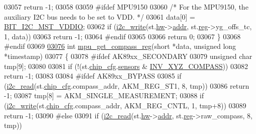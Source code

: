 \begin{DoxyCode}
{{{{{{{{{{{{{{{{{{{{{{{{{{{{{{{{{{03057         \textcolor{keywordflow}{return} -1;
03058 
03059 \textcolor{preprocessor}{#ifdef MPU9150}
03060     \textcolor{comment}{/* For the MPU9150, the auxiliary I2C bus needs to be set to VDD. */}
03061     data[0] = \hyperlink{inv__mpu_8c_ac52d7caf4efc485ef6faa1211bfe60dc}{BIT\_I2C\_MST\_VDDIO};
03062     \textcolor{keywordflow}{if} (\hyperlink{_i2_c_8c_ac0f145afe8d662af199043939f4398d6}{i2c\_write}(st.\hyperlink{structgyro__state__s_a5bac30a96752691e4cc723735060e360}{hw}->\hyperlink{structhw__s_a4c34a946600e9d68b6355d23f54d291b}{addr}, st.\hyperlink{structgyro__state__s_ae857e1285c583b7438a208edd691a38e}{reg}->yg\_offs\_tc, 1, data))
03063         \textcolor{keywordflow}{return} -1;
03064 \textcolor{preprocessor}{#endif}
03065 
03066     \textcolor{keywordflow}{return} 0;
03067 \}
03068 \textcolor{preprocessor}{#endif}
03069 
\hypertarget{inv__mpu_8c_source.tex_l03076}{}\hyperlink{group___d_r_i_v_e_r_s_ga65e6b0ce980b8c0255d7be9b55c88c08}{03076} \textcolor{keywordtype}{int} \hyperlink{group___d_r_i_v_e_r_s_ga65e6b0ce980b8c0255d7be9b55c88c08}{mpu\_get\_compass\_reg}(\textcolor{keywordtype}{short} *data, \textcolor{keywordtype}{unsigned} \textcolor{keywordtype}{long} *timestamp)
03077 \{
03078 \textcolor{preprocessor}{#ifdef AK89xx\_SECONDARY}
03079     \textcolor{keywordtype}{unsigned} \textcolor{keywordtype}{char} tmp[9];
03080 
03081     \textcolor{keywordflow}{if} (!(st.\hyperlink{structgyro__state__s_ac895217592e2084bd520b0be8e9d20ee}{chip\_cfg}.\hyperlink{structchip__cfg__s_aaa21c01566947e7007476657cb614e3f}{sensors} & \hyperlink{group___d_r_i_v_e_r_s_ga7fc9c1dbdcb2ac8cc2a4128a5799482a}{INV\_XYZ\_COMPASS}))
03082         \textcolor{keywordflow}{return} -1;
03083 
03084 \textcolor{preprocessor}{#ifdef AK89xx\_BYPASS}
03085     \textcolor{keywordflow}{if} (\hyperlink{_i2_c_8c_ac2d47e7a6c76f93f9b537c31a2986e7b}{i2c\_read}(st.\hyperlink{structgyro__state__s_ac895217592e2084bd520b0be8e9d20ee}{chip\_cfg}.compass\_addr, AKM\_REG\_ST1, 8, tmp))
03086         \textcolor{keywordflow}{return} -1;
03087     tmp[8] = AKM\_SINGLE\_MEASUREMENT;
03088     \textcolor{keywordflow}{if} (\hyperlink{_i2_c_8c_ac0f145afe8d662af199043939f4398d6}{i2c\_write}(st.\hyperlink{structgyro__state__s_ac895217592e2084bd520b0be8e9d20ee}{chip\_cfg}.compass\_addr, AKM\_REG\_CNTL, 1, tmp+8))
03089         \textcolor{keywordflow}{return} -1;
03090 \textcolor{preprocessor}{#else}
03091     \textcolor{keywordflow}{if} (\hyperlink{_i2_c_8c_ac2d47e7a6c76f93f9b537c31a2986e7b}{i2c\_read}(st.\hyperlink{structgyro__state__s_a5bac30a96752691e4cc723735060e360}{hw}->\hyperlink{structhw__s_a4c34a946600e9d68b6355d23f54d291b}{addr}, st.\hyperlink{structgyro__state__s_ae857e1285c583b7438a208edd691a38e}{reg}->raw\_compass, 8, tmp))
}}}}}}}}}}}}}}}}}}}}}}}}}}}}}}}}}}
\end{DoxyCode}

